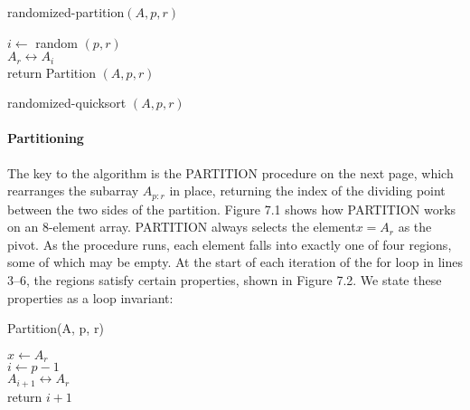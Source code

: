 \begin{algbox}{randomized-partition$(A, p, r)$}
  \begin{algorithm}[H]
      $i \leftarrow $ random $(p, r)$ \\
      $A_{r} \leftrightarrow A_{i} $ \\
      return Partition $(A, p, r)$
    \end{algorithm}
\end{algbox}
 \begin{algbox}{randomized-quicksort $(A, p, r)$}
      \begin{algorithm}[H]
      \end{algorithm}
    \end{algbox}

\paragraph{Partitioning }
The key to the algorithm is the PARTITION procedure on the next page, which rearranges the subarray $ A_{p : r}$ in place, returning the index of the dividing point between the two sides of the partition.
Figure 7.1 shows how PARTITION works on an 8-element array. PARTITION always selects the element$ x = A_{r}$ as the pivot. As the procedure runs, each element falls into exactly one of four regions, some of which may be empty. At the start of each iteration of the for loop in lines 3–6, the regions satisfy certain properties, shown in Figure 7.2. We state these properties as a loop invariant:

\begin{algbox}{Partition(A, p, r)}
  \begin{algorithm}[H]
    $ x \leftarrow A_{r} $ \\
    $ i \leftarrow p - 1 $ \\
   $ A_{i+1} \leftrightarrow A_{r} $\\
   return $ i+1$
  \end{algorithm}
\end{algbox}

